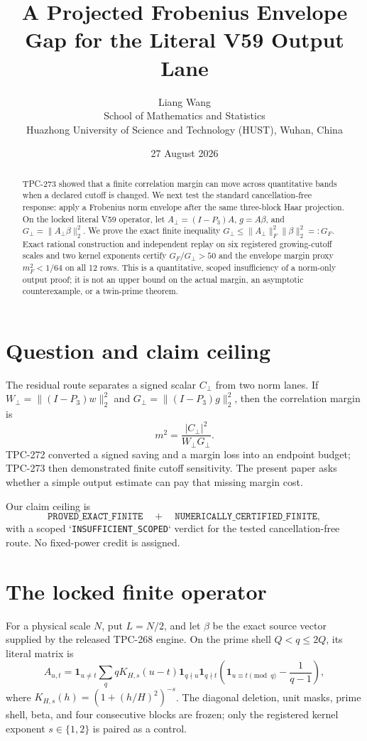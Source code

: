 \documentclass[11pt]{article}
\title{A Projected Frobenius Envelope Gap for the Literal V59 Output Lane}
\author{Liang Wang\\
School of Mathematics and Statistics\\
Huazhong University of Science and Technology (HUST), Wuhan, China}
\date{27 August 2026}
\newcommand{\Aperp}{A_{\perp}}
\newcommand{\Gperp}{G_{\perp}}
\newcommand{\GF}{G_F}
\newcommand{\Cperp}{C_{\perp}}
\newcommand{\Wperp}{W_{\perp}}
\newcommand{\mF}{m_F}
\begin{document}
\maketitle

\begin{abstract}
TPC-273 showed that a finite correlation margin can move across quantitative
bands when a declared cutoff is changed.  We next test the standard
cancellation-free response: apply a Frobenius norm envelope after the same
three-block Haar projection.  On the locked literal V59 operator, let
\(\Aperp=(I-P_3)A\), \(g= A\beta\), and
\(\Gperp=\|\Aperp\beta\|_2^2\).  We prove the exact finite inequality
\(\Gperp\leq\|\Aperp\|_F^2\|\beta\|_2^2=:\GF\).  Exact rational construction and
independent replay on six registered growing-cutoff scales and two kernel
exponents certify \(\GF/\Gperp>50\) and the envelope margin proxy
\(\mF^2<1/64\) on all 12 rows.  This is a quantitative, scoped insufficiency
of a norm-only output proof; it is not an upper bound on the actual margin,
an asymptotic counterexample, or a twin-prime theorem.
\end{abstract}

\section{Question and claim ceiling}

The residual route separates a signed scalar \(\Cperp\) from two norm lanes.  If
\(\Wperp=\|(I-P_3)w\|_2^2\) and \(\Gperp=\|(I-P_3)g\|_2^2\), then the correlation
margin is
\[
 m^2=\frac{|\Cperp|^2}{\Wperp\Gperp}.
\]
TPC-272 converted a signed saving and a margin loss into an endpoint budget;
TPC-273 then demonstrated finite cutoff sensitivity.  The present paper asks
whether a simple output estimate can pay that missing margin cost.

Our claim ceiling is
\[
\texttt{PROVED\_EXACT\_FINITE} \quad+\quad
\texttt{NUMERICALLY\_CERTIFIED\_FINITE},
\]
with a scoped `\texttt{INSUFFICIENT\_SCOPED}` verdict for the tested
cancellation-free route.  No fixed-power credit is assigned.

\section{The locked finite operator}

For a physical scale \(N\), put \(L=N/2\), and let \(\beta\) be the exact
source vector supplied by the released TPC-268 engine.  On the prime shell
\(Q<q\leq 2Q\), its literal matrix is
\[
 A_{u,t}=\mathbf 1_{u\ne t}\sum_q qK_{H,s}(u-t)
 \mathbf 1_{q\nmid u}\mathbf 1_{q\nmid t}
 \left(\mathbf 1_{u\equiv t\pmod q}-\frac1{q-1}\right),
\]
where \(K_{H,s}(h)=(1+(h/H)^2)^{-s}\).  The diagonal deletion, unit masks,
prime shell, beta, and four consecutive blocks are frozen; only the registered
kernel exponent \(s\in\{1,2\}\) is paired as a control.
\end{document}
